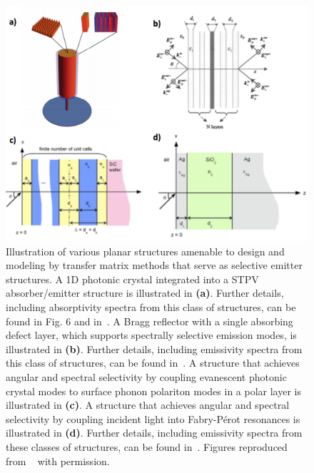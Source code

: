 \documentclass[review]{elsarticle}
\begin{document}
\begin{figure}[ht!]
	\includegraphics[width=\textwidth]{Planar}
	\caption{\label{Fan}  Illustration of various planar structures amenable to design and modeling
by transfer matrix methods that serve as selective emitter structures.  
A 1D photonic crystal integrated into a STPV absorber/emitter structure is  
illustrated in {\bf (a)}. Further details, including absorptivity spectra from this class of structures, can be found
in Fig. 6 and in~\cite{paper1_ref4}.  A Bragg reflector with a single absorbing defect layer,
which supports spectrally selective emission modes, is illustrated in {\bf (b)}. Further details, including emissivity spectra from this class of
structures, can be found in~\cite{BN_JApplPhys_2005}.
A structure that achieves angular and spectral selectivity by coupling evanescent photonic crystal modes
to surface phonon polariton modes in a polar layer is illustrated in {\bf (c)}.  
A structure that achieves angular and spectral selectivity by coupling incident light into Fabry-P\'{e}rot
resonances is illustrated in {\bf (d)}.  Further details, including emissivity spectra from these classes of structures, can 
be found in~\cite{LZ_JApplPhys_2006}.  Figures reproduced from 
~\cite{paper1_ref4, BN_JApplPhys_2005, LZ_JApplPhys_2006} with permission.}

\end{figure}
\end{document}
